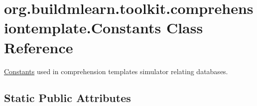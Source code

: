 \hypertarget{classorg_1_1buildmlearn_1_1toolkit_1_1comprehensiontemplate_1_1Constants}{}\section{org.\+buildmlearn.\+toolkit.\+comprehensiontemplate.\+Constants Class Reference}
\label{classorg_1_1buildmlearn_1_1toolkit_1_1comprehensiontemplate_1_1Constants}


\hyperlink{classorg_1_1buildmlearn_1_1toolkit_1_1comprehensiontemplate_1_1Constants}{Constants} used in comprehension template\textquotesingle{}s simulator relating databases.  


\subsection*{Static Public Attributes}
